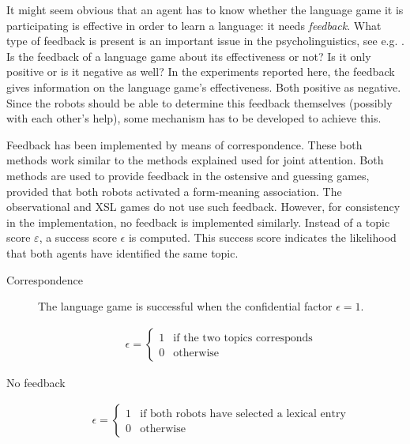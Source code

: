 It might seem obvious that an agent has to know whether the language game it is participating is effective in order to learn a language: it needs {\em feedback}. What type of feedback is present is an important issue in the psycholinguistics, see e.g. \citep{bowerman:1988}. Is the feedback of a language game about its effectiveness or not? Is it only positive or is it negative as well? In the experiments reported here, the feedback gives information on the language game's effectiveness. Both positive as negative. Since the robots should be able to determine this feedback themselves (possibly with each other's help), some mechanism has to be developed to achieve this.


Feedback has been implemented by means of correspondence. These both methods work similar to the methods explained used for joint attention. Both methods are used to provide feedback in the ostensive and guessing games, provided that both robots activated a form-meaning association.  The observational and XSL games do not use such feedback. However, for consistency in the implementation, no feedback is implemented similarly. Instead of a topic score $\varepsilon$, a success score $\epsilon$ is computed. This success score indicates the likelihood that both agents have identified the same topic.

\begin{description}
\item[Correspondence]
The language game is successful when the confidential factor $\epsilon=1$.
 
\begin{eqnarray}\epsilon = \left \{ \begin{array}{rl}
1 & \mbox{if the two topics corresponds}\\
0 & \mbox{otherwise}
\end{array}
\right.
\end{eqnarray}

\item[No feedback]

\begin{eqnarray}
\epsilon = \left \{ \begin{array}{rl}
1 & \mbox{if both robots have selected a lexical entry}\\
0 & \mbox{otherwise}
\end{array}
\right.
\end{eqnarray}
\end{description}


